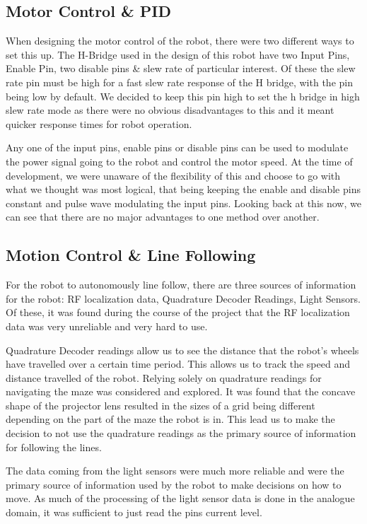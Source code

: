 \documentclass{article}
\begin{document}
\subsection{Motor Control \& PID}

When designing the motor control of the robot, there were two different ways to set this up. The H-Bridge used in the design of this robot have two Input Pins, Enable Pin, two disable pins \& slew rate of particular interest. Of these the slew rate pin must be high for a fast slew rate response of the H bridge, with the pin being low by default. We decided to keep this pin high to set the h bridge in high slew rate mode as there were no obvious disadvantages to this and it meant quicker response times for robot operation.

Any one of the input pins, enable pins or disable pins can be used to modulate the power signal going to the robot and control the motor speed. At the time of development, we were unaware of the flexibility of this and choose to go with what we thought was most logical, that being keeping the enable and disable pins constant and pulse wave modulating the input pins. Looking back at this now, we can see that there are no major advantages to one method over another.

\subsection{Motion Control \& Line Following}

For the robot to autonomously line follow, there are three sources of information for the robot: RF localization data, Quadrature Decoder Readings, Light Sensors. Of these, it was found during the course of the project that the RF localization data was very unreliable and very hard to use.

Quadrature Decoder readings allow us to see the distance that the robot's wheels have travelled over a certain time period. This allows us to track the speed and distance travelled of the robot. Relying solely on quadrature readings for navigating the maze was considered and explored. It was found that the concave shape of the projector lens resulted in the sizes of a grid being different depending on the part of the maze the robot is in. This lead us to make the decision to not use the quadrature readings as the primary source of information for following the lines.

The data coming from the light sensors were much more reliable and were the primary source of information used by the robot to make decisions on how to move. As much of the processing of the light sensor data is done in the analogue domain, it was sufficient to just read the pins current level.
\end{document}
